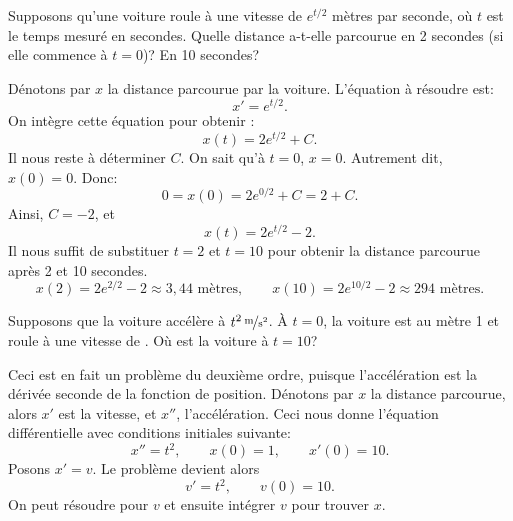 \begin{example}
	Supposons qu'une voiture roule à une vitesse de $e^{t/2}$ mètres par seconde,
	où $t$ est le temps mesuré en secondes.
	Quelle distance a-t-elle parcourue en 2 secondes (si elle commence à $t=0$)?
	En 10 secondes?

	Dénotons par $x$ la distance parcourue par la voiture.
	L'équation à résoudre est:
	\begin{equation*}
		x' = e^{t/2} .
	\end{equation*}
	On intègre cette équation pour obtenir :
	\begin{equation*}
		x(t) = 2 e^{t/2} + C .
	\end{equation*}
	Il nous reste à déterminer $C$.  On sait qu'à $t=0$,
	$x=0$.  Autrement dit, $x(0) = 0$.  Donc:
	\begin{equation*}
		0 = x(0) = 2e^{0/2} + C = 2 + C .
	\end{equation*}
	Ainsi, $C = -2$, et
	\begin{equation*}
		x(t) = 2 e^{t/2} - 2 .
	\end{equation*}
	Il nous suffit de substituer $t=2$ et $t=10$ pour obtenir la distance parcourue après 2 et 10 secondes.
	\begin{equation*}
		x(2) = 2e^{2/2} - 2 \approx 3{,}44 \text{ mètres} ,
		\qquad
		x(10) = 2e^{10/2} - 2 \approx 294 \text{ mètres} .
	\end{equation*}
\end{example}

\begin{example}
	Supposons que la voiture accélère à $\unitfrac[t^2]{m}{s^2}$.
	À $t=0$, la voiture est au mètre 1 et roule à une vitesse de .
	Où est la voiture à $t=10$?

	Ceci est en fait un problème du deuxième ordre, puisque l'accélération est la dérivée seconde de la fonction de position.
	Dénotons par $x$ la distance parcourue, alors $x'$ est la vitesse, et $x''$, l'accélération.
	Ceci nous donne l'équation différentielle avec conditions initiales suivante:
	\begin{equation*}
		x'' = t^2 , \qquad x(0) = 1 , \qquad x'(0) = 10 .
	\end{equation*}
	Posons $x' = v$.  Le problème devient alors
	\begin{equation*}
		v' = t^2, \qquad v(0) = 10 .
	\end{equation*}
	On peut résoudre pour $v$ et ensuite intégrer $v$ pour trouver $x$.
\end{example}

